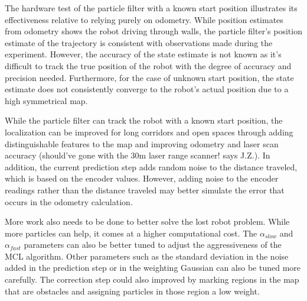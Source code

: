 \documentclass[conference]{../IEEEtran}
\begin{document}
The hardware test of the particle filter with a known start position illustrates its
effectiveness relative to relying purely on odometry.  While position estimates from
odometry shows the robot driving through walls, the particle filter's position estimate of
the trajectory is consistent with observations made during the experiment. However, the
accuracy of the state estimate is not known as it's difficult to track the true position
of the robot with the degree of accuracy and precision needed. Furthermore, for the case
of unknown start position, the state estimate does not consistently converge to the
robot's actual position due to a high symmetrical map.

While the particle filter can track the robot with a known start position, the
localization can be improved for long corridors and open spaces through adding
distinguishable features to the map and improving odometry and laser scan accuracy
(should've gone with the 30m laser range scanner! says J.Z.).  In addition, the current
prediction step adds random noise to the distance traveled, which is based on the encoder
values. However, adding noise to the encoder readings rather than the distance traveled
may better simulate the error that occurs in the odometry calculation.

More work also needs to be done to better solve the lost robot problem.  While more
particles can help, it comes at a higher computational cost.  The $\alpha_{slow}$ and
$\alpha_{fast}$ parameters can also be better tuned to adjust the aggressiveness of the
MCL algorithm.  Other parameters such as the standard deviation in the noise added in the
prediction step or in the weighting Gaussian can also be tuned more carefully.  The
correction step could also improved by marking regions in the map that are obstacles and
assigning particles in those region a low weight.

\nocite{*}


\end{document}
